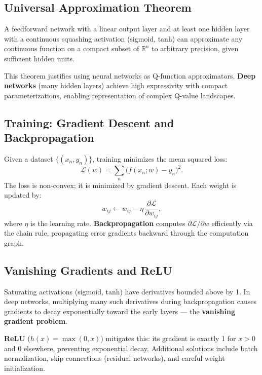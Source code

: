 \documentclass[11pt,a4paper]{article}
\theoremstyle{definition}
\theoremstyle{plain}
\theoremstyle{remark}
\begin{document}
\subsection{Universal Approximation Theorem}

\begin{tcolorbox}[colback=blue!5!white,colframe=blue!75!black,title=\textbf{Universal Approximation (Hornik et al., 1989; Cybenko, 1989)}]
A feedforward network with a linear output layer and at least one hidden layer with a continuous squashing activation (sigmoid, tanh) can approximate any continuous function on a compact subset of $\mathbb{R}^n$ to arbitrary precision, given sufficient hidden units.
\end{tcolorbox}

This theorem justifies using neural networks as Q-function approximators. \textbf{Deep networks} (many hidden layers) achieve high expressivity with compact parameterizations, enabling representation of complex Q-value landscapes.

\subsection{Training: Gradient Descent and Backpropagation}

Given a dataset $\{(x_n, y_n)\}$, training minimizes the mean squared loss:
\[
    \mathcal{L}(w) = \sum_n \bigl(f(x_n; w) - y_n\bigr)^2. %
\]
The loss is non-convex; it is minimized by gradient descent. Each weight is updated by:
\[
    w_{ij} \leftarrow w_{ij} - \eta\, \frac{\partial \mathcal{L}}{\partial w_{ij}},
\]
where $\eta$ is the learning rate. \textbf{Backpropagation} computes $\partial \mathcal{L}/\partial w$ efficiently via the chain rule, propagating error gradients backward through the computation graph.

\subsection{Vanishing Gradients and ReLU}

Saturating activations (sigmoid, tanh) have derivatives bounded above by 1. In deep networks, multiplying many such derivatives during backpropagation causes gradients to decay exponentially toward the early layers — the \textbf{vanishing gradient problem}.

\textbf{ReLU} ($h(x) = \max(0, x)$) mitigates this: its gradient is exactly 1 for $x > 0$ and 0 elsewhere, preventing exponential decay. Additional solutions include batch normalization, skip connections (residual networks), and careful weight initialization.
\end{document}
